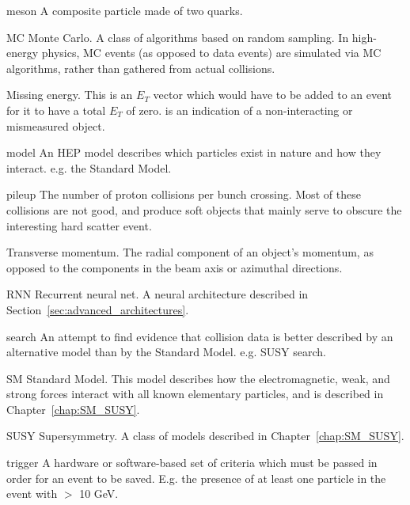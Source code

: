 \begin{symbollist*}
\item[meson] A composite particle made of two quarks.
\item[MC] Monte Carlo. A class of algorithms based on random sampling. In high-energy physics, MC events (as opposed to data events) are simulated via MC algorithms, rather than gathered from actual collisions.
\item[\MET] Missing energy. This is an $E_T$ vector which would have to be added to an event for it to have a total $E_T$ of zero. \MET is an indication of a non-interacting or mismeasured object.
\item[model] An HEP model describes which particles exist in nature and how they interact. e.g. the Standard Model.
\item[pileup] The number of proton collisions per bunch crossing. Most of these collisions are not good, and produce soft objects that mainly serve to obscure the interesting hard scatter event.
\item[\pt] Transverse momentum. The radial component of an object's momentum, as opposed to the components in the beam axis or azimuthal directions.
\item[RNN] Recurrent neural net. A neural architecture described in Section~\ref{sec:advanced_architectures}.
\item[search] An attempt to find evidence that collision data is better described by an alternative model than by the Standard Model. e.g. SUSY search.
\item[SM] Standard Model. This model describes how the electromagnetic, weak, and strong forces interact with all known elementary particles, and is described in Chapter~\ref{chap:SM_SUSY}.
\item[SUSY] Supersymmetry. A class of models described in Chapter~\ref{chap:SM_SUSY}.
\item[trigger] A hardware or software-based set of criteria which must be passed in order for an event to be saved. E.g. the presence of at least one particle in the event with \pt $>$ 10 GeV.

\end{symbollist*}